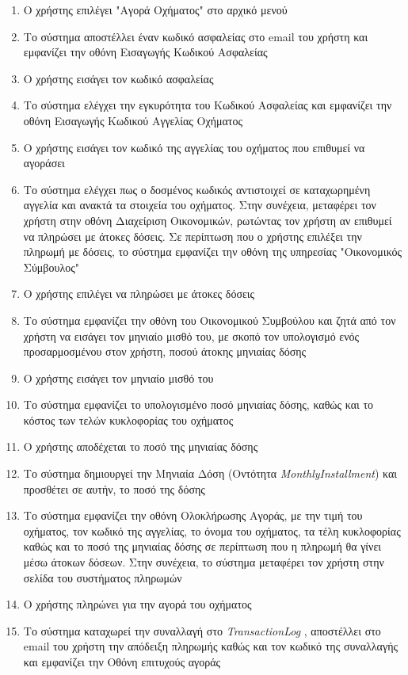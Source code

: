 \documentclass{../ol-softwaremanual}
\begin{document}
	\begin{enumerate}
		\item Ο χρήστης επιλέγει \en"\gr Αγορά Οχήματος\en" \gr στο αρχικό μενού
		\item Το σύστημα αποστέλλει έναν κωδικό ασφαλείας στο \en email \gr του χρήστη και εμφανίζει την οθόνη Εισαγωγής Κωδικού Ασφαλείας
		\item Ο χρήστης εισάγει τον κωδικό ασφαλείας		
		\item Το σύστημα ελέγχει την εγκυρότητα του Κωδικού Ασφαλείας και εμφανίζει την οθόνη Εισαγωγής Κωδικού Αγγελίας Οχήματος
		\item Ο χρήστης εισάγει τον κωδικό της αγγελίας	του οχήματος που επιθυμεί να αγοράσει
		\item Το σύστημα ελέγχει πως ο δοσμένος κωδικός αντιστοιχεί σε καταχωρημένη αγγελία και ανακτά τα στοιχεία του οχήματος. Στην συνέχεια, μεταφέρει τον χρήστη στην οθόνη Διαχείριση Οικονομικών, ρωτώντας τον χρήστη αν επιθυμεί να πληρώσει με άτοκες δόσεις. Σε περίπτωση που ο χρήστης επιλέξει την πληρωμή με δόσεις, το σύστημα εμφανίζει την οθόνη της υπηρεσίας \en"\gr Οικονομικός Σύμβουλος\en"\gr
		\item Ο χρήστης επιλέγει να πληρώσει με άτοκες δόσεις
		\item Το σύστημα εμφανίζει την οθόνη του Οικονομικού Συμβούλου και ζητά από τον χρήστη να εισάγει τον μηνιαίο μισθό του, με σκοπό τον υπολογισμό ενός προσαρμοσμένου στον χρήστη, ποσού άτοκης μηνιαίας δόσης
		\item Ο χρήστης εισάγει τον μηνιαίο μισθό του
		\item Το σύστημα εμφανίζει το υπολογισμένο ποσό μηνιαίας δόσης, καθώς και το κόστος των τελών κυκλοφορίας του οχήματος
		\item Ο χρήστης αποδέχεται το ποσό της μηνιαίας δόσης
		\item Το σύστημα δημιουργεί την Μηνιαία Δόση (Οντότητα \en \textit{MonthlyInstallment}\gr) και προσθέτει σε αυτήν, το ποσό της δόσης		
		\item Το σύστημα εμφανίζει την οθόνη Ολοκλήρωσης Αγοράς, με την τιμή του οχήματος, τον κωδικό της αγγελίας, το όνομα του οχήματος, τα τέλη κυκλοφορίας καθώς και το ποσό της μηνιαίας δόσης σε περίπτωση που η πληρωμή θα γίνει μέσω άτοκων δόσεων. Στην συνέχεια, το σύστημα μεταφέρει τον χρήστη στην σελίδα του συστήματος πληρωμών
		\item Ο χρήστης πληρώνει για την αγορά του οχήματος
		\item Το σύστημα καταχωρεί την συναλλαγή στο \en \textit{TransactionLog} \gr, αποστέλλει στο \en email \gr του χρήστη την απόδειξη πληρωμής καθώς και τον κωδικό της συναλλαγής και εμφανίζει την Οθόνη επιτυχούς αγοράς
	\end{enumerate}
	
\end{document}
